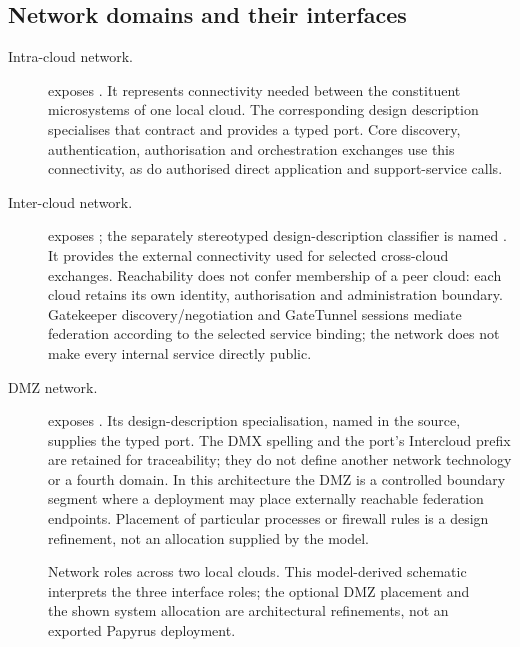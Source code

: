 \subsection{Network domains and their interfaces}
\begin{description}
\item[Intra-cloud network.]  exposes . It represents connectivity needed between the constituent microsystems of one local cloud. The corresponding design description specialises that contract and provides a typed  port. Core discovery, authentication, authorisation and orchestration exchanges use this connectivity, as do authorised direct application and support-service calls.
\item[Inter-cloud network.]  exposes ; the separately stereotyped design-description classifier is named . It provides the external connectivity used for selected cross-cloud exchanges. Reachability does not confer membership of a peer cloud: each cloud retains its own identity, authorisation and administration boundary. Gatekeeper discovery/negotiation and GateTunnel sessions mediate federation according to the selected service binding; the network does not make every internal service directly public.
\item[DMZ network.]  exposes . Its design-description specialisation, named  in the source, supplies the typed  port. The DMX spelling and the port's Intercloud prefix are retained for traceability; they do not define another network technology or a fourth domain. In this architecture the DMZ is a controlled boundary segment where a deployment may place externally reachable federation endpoints. Placement of particular processes or firewall rules is a design refinement, not an allocation supplied by the model.
\end{description}

\begin{figure}[htbp]
\centering

\caption{Network roles across two local clouds. This model-derived schematic interprets the three interface roles; the optional DMZ placement and the shown system allocation are architectural refinements, not an exported Papyrus deployment.}
\label{fig:network-architecture-model}
\end{figure}
\FloatBarrier


